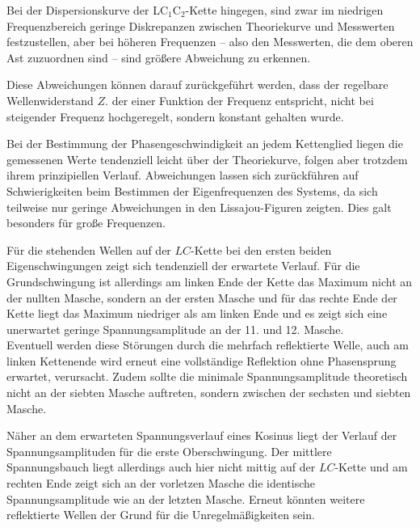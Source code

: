 Bei der Dispersionskurve der LC$_1$C$_2$-Kette hingegen, sind zwar im niedrigen Frequenzbereich
geringe Diskrepanzen zwischen Theoriekurve und Messwerten festzustellen, aber bei höheren
Frequenzen -- also den Messwerten, die dem oberen Ast zuzuordnen sind -- sind größere Abweichung
zu erkennen.

Diese Abweichungen können darauf zurückgeführt werden, dass der regelbare Wellenwiderstand $Z$.
der einer Funktion der Frequenz entspricht, nicht bei steigender Frequenz hochgeregelt,
sondern konstant gehalten wurde.

Bei der Bestimmung der Phasengeschwindigkeit an jedem Kettenglied liegen die gemessenen Werte tendenziell leicht über der Theoriekurve, folgen aber trotzdem ihrem prinzipiellen Verlauf.
Abweichungen lassen sich  zurückführen auf Schwierigkeiten beim Bestimmen der Eigenfrequenzen des Systems, da sich teilweise nur geringe Abweichungen in den Lissajou-Figuren zeigten.
Dies galt besonders für große Frequenzen.

Für die stehenden Wellen auf der $LC$-Kette bei den ersten beiden Eigenschwingungen zeigt sich tendenziell der erwartete Verlauf.
Für die Grundschwingung ist allerdings am linken Ende der Kette das Maximum nicht an der nullten Masche, sondern an der ersten Masche und für das rechte Ende der Kette liegt das Maximum niedriger als am linken Ende und es zeigt sich eine unerwartet geringe Spannungsamplitude an der 11. und 12. Masche.\\
Eventuell werden diese Störungen durch die mehrfach reflektierte Welle, auch am linken Kettenende wird erneut eine vollständige Reflektion ohne Phasensprung erwartet, verursacht.
Zudem sollte die minimale Spannungsamplitude theoretisch nicht an der siebten Masche auftreten, sondern zwischen der sechsten und siebten Masche.

Näher an dem erwarteten Spannungsverlauf eines Kosinus liegt der Verlauf der Spannungsamplituden für die erste Oberschwingung.
Der mittlere Spannungsbauch liegt allerdings auch hier nicht mittig auf der $LC$-Kette und am rechten Ende zeigt sich an der vorletzen Masche die identische Spannungsamplitude wie an der letzten Masche.
Erneut könnten weitere reflektierte Wellen der Grund für die Unregelmäßigkeiten sein.
